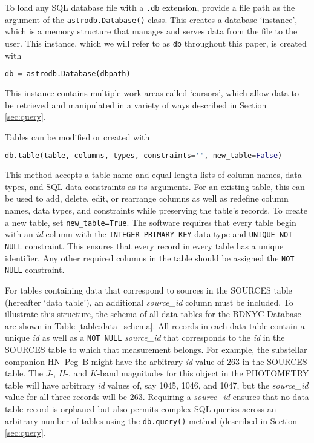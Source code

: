 \documentclass[iop,revtex4,natbib209]{emulateapj}
\begin{document}
To load any SQL database file with a \texttt{.db} extension, provide a file path as the argument of the \texttt{astrodb.Database()} class. This creates a database `instance', which is a memory structure that manages and serves data from the file to the user. This instance, which we will refer to as \texttt{db} throughout this paper, is created with

\begin{lstlisting}[language=Python]
db = astrodb.Database(dbpath)
\end{lstlisting}

This instance contains multiple work areas called `cursors', which allow data to be retrieved and manipulated in a variety of ways described in Section \ref{sec:query}. 

Tables can be modified or created with 

\begin{lstlisting}[language=Python]
db.table(table, columns, types, constraints='', new_table=False)
\end{lstlisting}

This method accepts a table name and equal length lists of column names, data types, and SQL data constraints as its arguments. For an existing table, this can be used to add, delete, edit, or rearrange columns as well as redefine column names, data types, and constraints while preserving the table's records. To create a new table, set \texttt{new\_table=True}. The software requires that every table begin with an \textit{id} column with the \texttt{INTEGER PRIMARY KEY} data type and \texttt{UNIQUE NOT NULL} constraint. This ensures that every record in every table has a unique identifier. Any other required columns in the table should be assigned the \texttt{NOT NULL} constraint.

For tables containing data that correspond to sources in the SOURCES table (hereafter `data table'), an additional \textit{source\_id} column must be included. To illustrate this structure, the schema of all data tables for the BDNYC Database are shown in Table \ref{table:data_schema}. All records in each data table contain a unique \textit{id} as well as a \texttt{NOT NULL} \textit{source\_id} that corresponds to the \textit{id} in the SOURCES table to which that measurement belongs. For example, the substellar companion HN~Peg~B might have the arbitrary \textit{id} value of 263 in the SOURCES table. The $J$-, $H$-, and $K$-band magnitudes for this object in the PHOTOMETRY table will have arbitrary \textit{id} values of, say 1045, 1046, and 1047, but the \textit{source\_id} value for all three records will be 263. Requiring a \textit{source\_id} ensures that no data table record is orphaned but also permits complex SQL queries across an arbitrary number of tables using the \texttt{db.query()} method (described in Section \ref{sec:query}.
\end{document}
